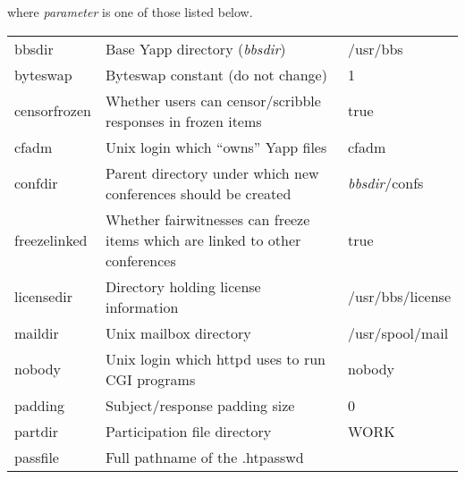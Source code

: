 \documentclass[twoside]{report}
\begin{document}
      where {\em parameter} is one of those listed below.
      \vspace{12pt}

      \tablelasttail{\hline}
      \begin{supertabular}{lp{7cm}l}
          bbsdir             & Base Yapp directory ({\em bbsdir})
             & /usr/bbs\\
          byteswap         & Byteswap constant (do not change)&  1 \\
          censorfrozen       &  
             Whether users can censor/scribble responses in frozen items & 
             true \\
          cfadm               &  Unix login which ``owns'' Yapp files&  cfadm \\
          confdir           &  
             Parent directory under which new conferences should be created &   
             {\em bbsdir}/confs\\
          freezelinked &
             Whether fairwitnesses can freeze items  which are linked to 
             other conferences             & true \\
          licensedir     & Directory holding license 
             information                   & /usr/bbs/license\\
          maildir           & Unix mailbox directory 
                                           &  /usr/spool/mail\\
          nobody             &  Unix login which httpd uses to run 
             CGI programs & nobody\\
          padding           & Subject/response padding size  
                                           & 0\\
          partdir           & Participation file directory   
                                           & WORK\\
          passfile         & Full pathname of the .htpasswd 

\end{supertabular}
\end{document}
